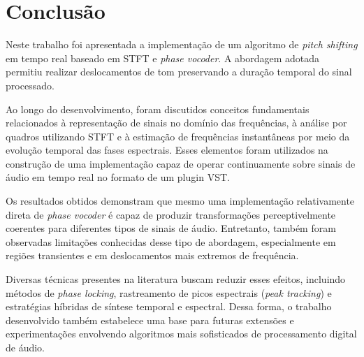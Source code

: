 \section{Conclusão}\label{sec:conclusao}

Neste trabalho foi apresentada a implementação de um algoritmo de \textit{pitch shifting} em tempo real baseado em STFT e \textit{phase vocoder}. A abordagem adotada permitiu realizar deslocamentos de tom preservando a duração temporal do sinal processado.

Ao longo do desenvolvimento, foram discutidos conceitos fundamentais relacionados à representação de sinais no domínio das frequências, à análise por quadros utilizando STFT e à estimação de frequências instantâneas por meio da evolução temporal das fases espectrais. Esses elementos foram utilizados na construção de uma implementação capaz de operar continuamente sobre sinais de áudio em tempo real no formato de um plugin VST.

Os resultados obtidos demonstram que mesmo uma implementação relativamente direta de \textit{phase vocoder} é capaz de produzir transformações perceptivelmente coerentes para diferentes tipos de sinais de áudio. Entretanto, também foram observadas limitações conhecidas desse tipo de abordagem, especialmente em regiões transientes e em deslocamentos mais extremos de frequência.

Diversas técnicas presentes na literatura buscam reduzir esses efeitos, incluindo métodos de \textit{phase locking}, rastreamento de picos espectrais (\textit{peak tracking}) e estratégias híbridas de síntese temporal e espectral. Dessa forma, o trabalho desenvolvido também estabelece uma base para futuras extensões e experimentações envolvendo algoritmos mais sofisticados de processamento digital de áudio.